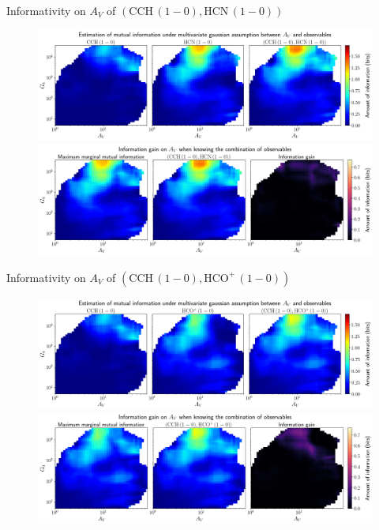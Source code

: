 \documentclass{beamer}
\begin{document}
\begin{frame}{Informativity on $A_V$ of $\left(\mathrm{CCH\,(1-0)},\mathrm{HCN\,(1-0)}\right)$}
    \begin{figure}
        \centering
        \includegraphics[width=0.95\linewidth]{../linearinfo/av__cch10_hcn10_linearinfo.png}
        \vfill
        \includegraphics[width=0.95\linewidth]{../linearinfo/av__cch10_hcn10_linearinfo_gain.png}
    \end{figure}
\end{frame}

\begin{frame}{Informativity on $A_V$ of $\left(\mathrm{CCH\,(1-0)},\mathrm{HCO^+\,(1-0)}\right)$}
    \begin{figure}
        \centering
        \includegraphics[width=0.95\linewidth]{../linearinfo/av__cch10_hcop10_linearinfo.png}
        \vfill
        \includegraphics[width=0.95\linewidth]{../linearinfo/av__cch10_hcop10_linearinfo_gain.png}
    \end{figure}
\end{frame}
\end{document}
